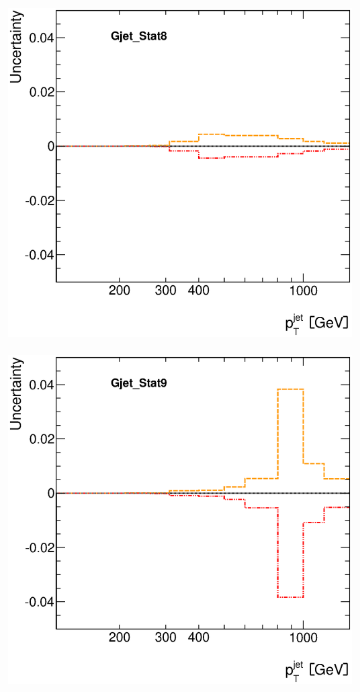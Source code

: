 \documentclass[12pt, twoside]{article}
\numberwithin{equation}{section}
\numberwithin{figure}{section}
\newenvironment{changemargin}[2]{%
\begin{list}{}{%
\setlength{\topsep}{0pt}%
\setlength{\leftmargin}{#1}%
\setlength{\rightmargin}{#2}%
\setlength{\listparindent}{\parindent}%
\setlength{\itemindent}{\parindent}%
\setlength{\parsep}{\parskip}%
}%
\item[]}{\end{list}}
\begin{document}
\begin{figure}[H]
\begin{changemargin}{-1.0cm}{-0.75cm}
\begin{changemargin}{-0.75cm}{-1.0cm}
        \begin{subfigure}[b]{0.25\textwidth}
            \includegraphics[width=\textwidth]{./images/JetSystematics/JetSystematic-17.eps}
        \end{subfigure}
        \begin{subfigure}[b]{0.25\textwidth}
            \includegraphics[width=\textwidth]{./images/JetSystematics/JetSystematic-18.eps}

\end{subfigure}
\end{changemargin}
\end{changemargin}
\end{figure}
\end{document}
